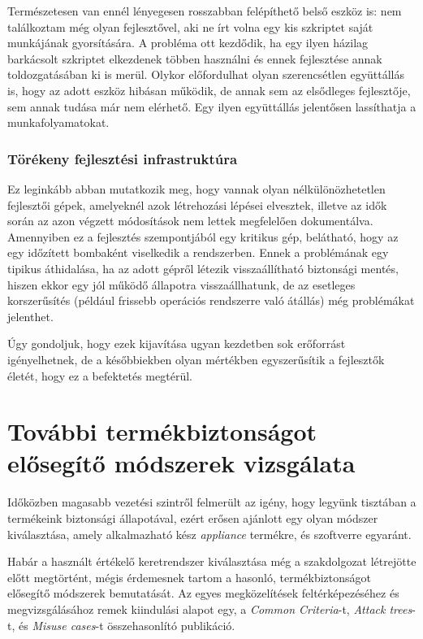 Természetesen van ennél lényegesen rosszabban felépíthető belső eszköz is: nem találkoztam még olyan
fejlesztővel, aki ne írt volna egy kis szkriptet saját munkájának gyorsítására. A probléma ott
kezdődik, ha egy ilyen házilag barkácsolt szkriptet elkezdenek többen használni és ennek fejlesztése
annak toldozgatásában ki is merül. Olykor előfordulhat olyan szerencsétlen együttállás is, hogy 
az adott eszköz hibásan működik, de annak sem az elsődleges fejlesztője, sem annak tudása már nem
elérhető. Egy ilyen együttállás jelentősen lassíthatja a munkafolyamatokat.

\subsubsection{Törékeny fejlesztési infrastruktúra}
Ez leginkább abban mutatkozik meg, hogy vannak olyan nélkülönözhetetlen fejlesztői gépek, amelyeknél
azok létrehozási lépései elvesztek, illetve az idők során az azon végzett módosítások nem lettek
megfelelően dokumentálva. Amennyiben ez a fejlesztés szempontjából egy kritikus gép, belátható, hogy
az egy időzített bombaként viselkedik a rendszerben. Ennek a problémának egy tipikus áthidalása, ha
az adott gépről létezik visszaállítható biztonsági mentés, hiszen ekkor egy jól működő állapotra
visszaállhatunk, de az esetleges korszerűsítés (például frissebb operációs rendszerre való átállás)
még problémákat jelenthet.

Úgy gondoljuk, hogy ezek kijavítása ugyan kezdetben sok erőforrást igényelhetnek, de a későbbiekben
olyan mértékben egyszerűsítik a fejlesztők életét, hogy ez a befektetés megtérül.

\section{További termékbiztonságot elősegítő módszerek vizsgálata}

Időközben magasabb vezetési szintről felmerült az igény, hogy legyünk tisztában a termékeink
biztonsági állapotával, ezért erősen ajánlott egy olyan módszer kiválasztása, amely alkalmazható
kész \emph{appliance} termékre, és szoftverre egyaránt.

Habár a használt értékelő keretrendszer kiválasztása még a szakdolgozat létrejötte előtt megtörtént,
mégis érdemesnek tartom a hasonló, termékbiztonságot elősegítő módszerek bemutatását. Az egyes
megközelítések feltérképezéséhez és megvizsgálásához remek kiindulási alapot egy, a \emph{Common
Criteria}-t, \emph{Attack trees}-t, és \emph{Misuse cases}-t összehasonlító publikáció.
\cite{ThreeApproaches}

